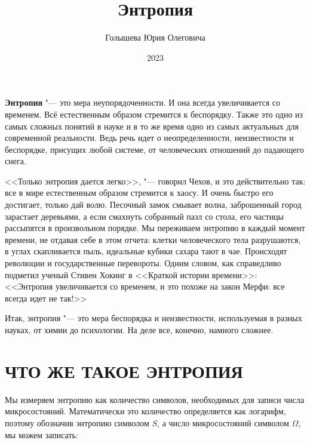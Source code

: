 \documentclass[referat, times]{SCWorks}
\begin{document}

\title{Энтропия}




\author{Голышева Юрия Олеговича}

\date{2023}

\maketitle

\tableofcontents

\intro
\textbf{Энтропия} "--- это мера неупорядоченности. И она всегда увеличивается со временем. Всё естественным образом стремится к беспорядку\cite{dzenopr}. Также это одно из самых сложных понятий в науке и в то же время одно из самых актуальных для современной реальности. Ведь речь идет о неопределенности, неизвестности и беспорядке, присущих любой системе, от человеческих отношений до падающего снега.

<<Только энтропия дается легко>>, "--- говорил Чехов, и это действительно так: все в мире естественным образом стремится к хаосу. И очень быстро его достигает, только дай волю. Песочный замок смывает волна, заброшенный город зарастает деревьями, а если смахнуть собранный пазл со стола, его частицы рассыпятся в произвольном порядке. Мы переживаем энтропию в каждый момент времени, не отдавая себе в этом отчета: клетки человеческого тела разрушаются, в углах скапливается пыль, идеальные кубики сахара тают в чае. Происходят революции и государственные перевороты. Одним словом, как справедливо подметил ученый Стивен Хокинг в <<Краткой истории времени>>: <<Энтропия увеличивается со временем, и это похоже на закон Мерфи: все всегда идет не так!>>

Итак, энтропия "--- это мера беспорядка и неизвестности, используемая в разных науках, от химии до психологии. На деле все, конечно, намного сложнее\cite{vved}. 

\section{ЧТО ЖЕ ТАКОЕ ЭНТРОПИЯ}
Мы измеряем энтропию как количество символов, необходимых для записи числа микросостояний. Математически это количество определяется как логарифм, поэтому обозначив энтропию символом $S$, а число микросостояний символом $\Omega$, мы можем записать:
\end{document}
